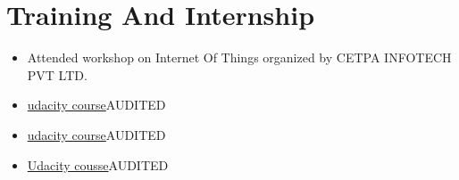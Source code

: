 \documentclass{article}
\begin{document}
\section{Training And Internship}
\begin{itemize}
\item {Attended workshop on Internet Of Things organized by CETPA INFOTECH PVT LTD.}
\item \href{https://classroom.udacity.com/courses/ud836}{udacity course}{AUDITED}
\item \href{https://classroom.udacity.com/courses/ud839}{udacity course}{AUDITED}
\item \href{https://classroom.udacity.com/courses/ud834}{Udacity cousse}{AUDITED}
\end{itemize}
\end{document}
